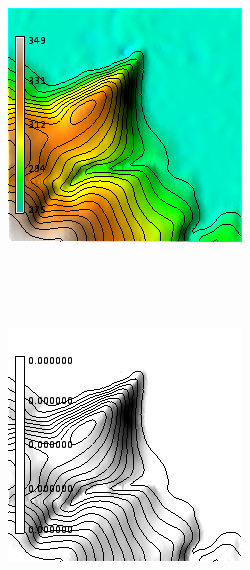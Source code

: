 \documentclass{sigchi}
\begin{document}

\begin{figure}
%
    \begin{minipage}[t]{0.33\textwidth}
        \begin{subfigure}{\linewidth}
            \centering
            \includegraphics[width=\textwidth]{figures/reference/dem_1.png}%
            \caption{}~\label{fig:ref}
        \end{subfigure}\\
        \begin{subfigure}{\linewidth}
            \centering
            \includegraphics[width=\textwidth]{figures/reference/diff_1.png}%

\end{subfigure}
\end{minipage}
\end{figure}
\end{document}
